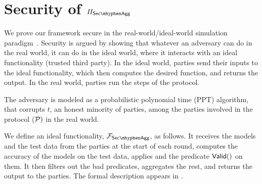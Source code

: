 \section{Security of $\PSecAgg$}
\label{app:proofs}

We prove our framework secure in the real-world/ideal-world simulation paradigm~\cite{EPRINT:Lindell16}. Security is argued by showing that whatever an adversary can do in the real world, it can do in the ideal world, where it interacts with an ideal functionality (trusted third party). In the ideal world, parties send their inputs to the ideal functionality, which then computes the desired function, and returns the output. In the real world, parties run the steps of the protocol.

The adversary is modeled as a probabilistic polynomial time (PPT) algorithm, that corrupts $t$, an honest minority of parties, among the parties involved in the protocol ($\mathcal{P}_{})$ in the real world.

We define an ideal functionality, $\FSecAgg$, as follows. It receives the models and the test data from the parties at the start of each round, computes the accuracy of the models on the test data, applies and the predicate $\mathsf{Valid}()$ on them. It then filters out the bad predicates, aggregates the rest, and returns the output to the parties. The formal description appears in .

